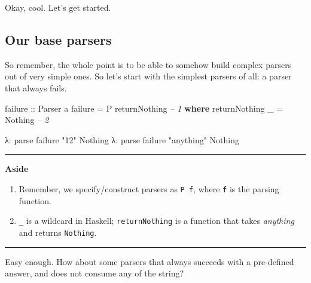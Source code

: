 \documentclass[]{article}
\newenvironment{Shaded}{}{}
\newcommand{\KeywordTok}[1]{\textcolor[rgb]{0.00,0.44,0.13}{\textbf{{#1}}}}
\newcommand{\DataTypeTok}[1]{\textcolor[rgb]{0.56,0.13,0.00}{{#1}}}
\newcommand{\StringTok}[1]{\textcolor[rgb]{0.25,0.44,0.63}{{#1}}}
\newcommand{\CommentTok}[1]{\textcolor[rgb]{0.38,0.63,0.69}{\textit{{#1}}}}
\newcommand{\OtherTok}[1]{\textcolor[rgb]{0.00,0.44,0.13}{{#1}}}
\newcommand{\FunctionTok}[1]{\textcolor[rgb]{0.02,0.16,0.49}{{#1}}}
\newcommand{\NormalTok}[1]{{#1}}
\begin{document}
Okay, cool. Let's get started.

\subsection{Our base parsers}\label{our-base-parsers}

So remember, the whole point is to be able to somehow build complex parsers out
of very simple ones. So let's start with the simplest parsers of all: a parser
that always fails.

\begin{Shaded}
\begin{Highlighting}[]
\OtherTok{failure ::} \DataTypeTok{Parser} \NormalTok{a}
\NormalTok{failure }\FunctionTok{=} \DataTypeTok{P} \NormalTok{returnNothing                   }\CommentTok{-- 1}
    \KeywordTok{where}
        \NormalTok{returnNothing _ }\FunctionTok{=} \DataTypeTok{Nothing}           \CommentTok{-- 2}
\end{Highlighting}
\end{Shaded}

\begin{Shaded}
\begin{Highlighting}[]
\NormalTok{λ}\FunctionTok{:} \NormalTok{parse failure }\StringTok{"12"}
\DataTypeTok{Nothing}
\NormalTok{λ}\FunctionTok{:} \NormalTok{parse failure }\StringTok{"anything"}
\DataTypeTok{Nothing}
\end{Highlighting}
\end{Shaded}

\begin{center}\rule{0.5\linewidth}{\linethickness}\end{center}

\textbf{Aside}

\begin{enumerate}
\def\labelenumi{\arabic{enumi}.}
\tightlist
\item
  Remember, we specify/construct parsers as \texttt{P\ f}, where \texttt{f} is
  the parsing function.
\item
  \texttt{\_} is a wildcard in Haskell; \texttt{returnNothing} is a function
  that takes \emph{anything} and returns \texttt{Nothing}.
\end{enumerate}

\begin{center}\rule{0.5\linewidth}{\linethickness}\end{center}

Easy enough. How about some parsers that always succeeds with a pre-defined
answer, and does not consume any of the string?
\end{document}

